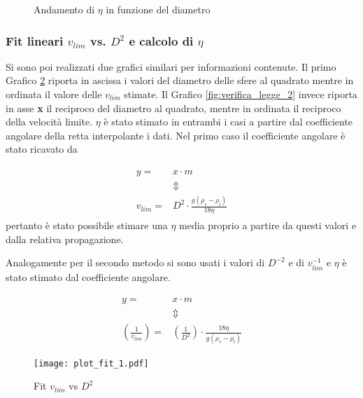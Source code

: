 \documentclass[a4paper,11pt,oneside]{article}
\begin{document}
\begin{figure}[h!]
    \centering
    \caption{Andamento di $\eta$ in funzione del diametro}
    \label{fig:eta}
\end{figure}




\subsubsection*{Fit lineari $v_{lim}$ vs. $D^2$ e calcolo di $\eta$}
Si sono poi realizzati due grafici similari per informazioni contenute. Il primo Grafico \ref{fig:verifica_legge_1} riporta in ascissa i valori del diametro delle sfere al quadrato mentre in ordinata il valore delle $v_{lim}$ stimate. Il Grafico \ref{fig:verifica_legge_2} invece riporta in asse \textbf{x} il reciproco del diametro al quadrato, mentre in ordinata il reciproco della velocità limite. $\eta$ è stato stimato in entrambi i casi a partire dal coefficiente angolare della retta interpolante i dati. Nel primo caso il coefficiente angolare è stato ricavato da

\begin{align*}
\begin{split}
  y=&x \cdot m \\
  &\Updownarrow \\
    v_{lim}=&D^{2} \cdot \frac{g (\rho_s - \rho_l)}{18 \eta}
\end{split}
\end{align*}
pertanto è stato possibile stimare una $\eta$ media proprio a partire da questi valori e dalla relativa propagazione.

Analogamente per il secondo metodo si sono usati i valori di $D^{-2}$ e di $v_{lim}^{-1}$ e $\eta$ è stato stimato dal coefficiente angolare.

\begin{align*}
\begin{split}
  y=&x \cdot m \\
  &\Updownarrow \\
    \left( \frac{1}{v_{lim}} \right)=&\left ( \frac{1}{D^{2}} \right ) \cdot \frac{18 \eta}{g (\rho_s - \rho_l)}
\end{split}
\end{align*}

\begin{figure}
    \centering
    \texttt{[image: plot\_fit\_1.pdf]}
    \caption{Fit $v_{lim}$ vs $D^2$}
    \label{fig:verifica_legge_1}
\end{figure}
\end{document}
